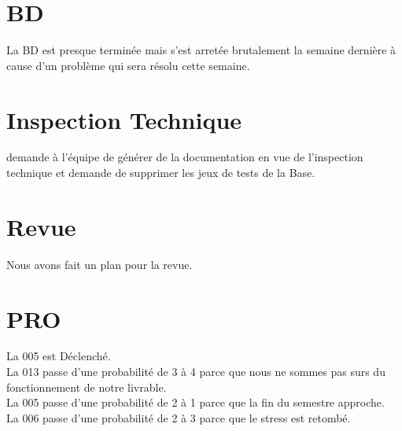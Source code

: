 \documentclass [a4paper] {article}
\begin{document}
\section{BD}
La BD est presque terminée mais s'est arretée brutalement la semaine dernière à cause d'un problème qui sera résolu cette semaine.

\section{Inspection Technique}
\Michel{} demande à l'équipe de générer de la documentation en vue de l'inspection technique et demande de supprimer les jeux de tests de la Base.

\section{Revue}
Nous avons fait un plan pour la revue.

\section{PRO}
La \FDR{} 005 est Déclenché. \\
La \FDR{} 013 passe d'une probabilité de 3 à 4 parce que nous ne sommes pas surs du fonctionnement de notre livrable. \\
La \FDO{} 005 passe d'une probabilité de 2 à 1 parce que la fin du semestre approche. \\
La \FDO{} 006 passe d'une probabilité de 2 à 3 parce que le stress est retombé.


\end{document}
